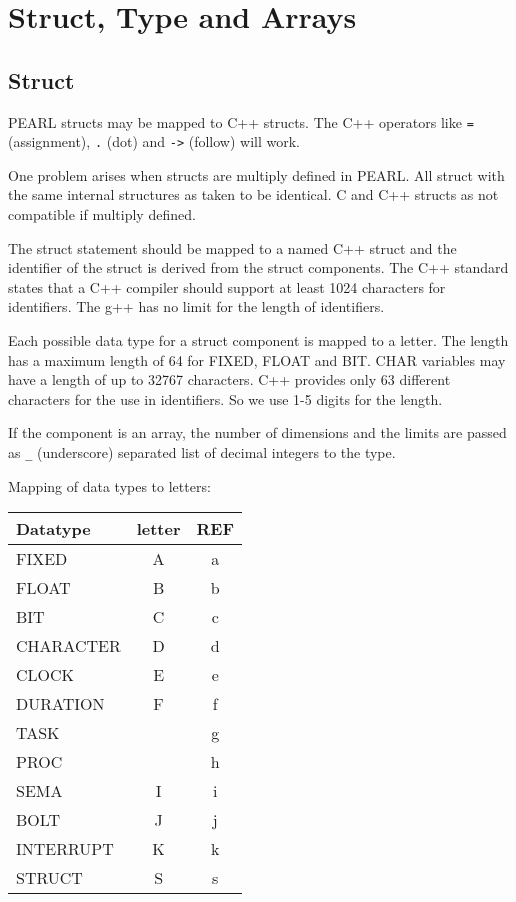 \chapter{Struct, Type and Arrays}

\section{Struct}
\label{sec:struct}

PEARL structs may be mapped to C++ structs.
The C++ operators like \verb|=| (assignment), \verb|.| (dot) and 
\verb|->| (follow) will work.

One problem arises when structs are multiply defined
in PEARL. All struct with the same internal structures as
taken to be identical. C and C++ structs as not compatible
if multiply defined.

The struct statement should be mapped to a named C++ struct and the identifier
of the struct is derived from the struct components.
The C++ standard states that a C++ compiler should support at least 1024
characters for identifiers. The g++ has no limit for the length of identifiers.

Each possible data type for a struct component is mapped to a letter.
The length has a maximum length of 64 for FIXED, FLOAT and BIT. CHAR
variables may have a length of up to 32767 characters.
 C++ provides only 63 different
 characters for the use in identifiers. So we use 1-5 digits
for the length.

If the component is an array, the number of dimensions and the
 limits are
passed as \verb|_| (underscore) separated list of decimal integers
to the type.

Mapping of data types to letters:

\begin{tabular}{|l|c|c|}
\hline
Datatype & letter & REF \\
\hline
FIXED & A &a\\
FLOAT & B &b\\
BIT  & C &c\\
CHARACTER & D &d \\
CLOCK  & E &e \\
DURATION & F&f \\
TASK & & g \\
PROC  & & h \\
SEMA & I & i \\
BOLT & J & j \\
INTERRUPT & K & k \\
\hline
STRUCT & S &s\\
\hline
\end{tabular}

